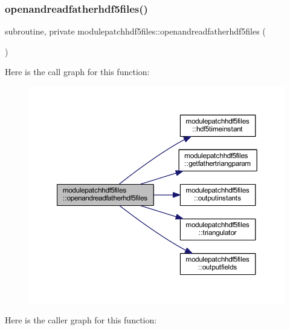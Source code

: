 \subsubsection{\texorpdfstring{openandreadfatherhdf5files()}{openandreadfatherhdf5files()}}
{\footnotesize\ttfamily subroutine, private modulepatchhdf5files\+::openandreadfatherhdf5files (\begin{DoxyParamCaption}{ }\end{DoxyParamCaption})\hspace{0.3cm}{\ttfamily [private]}}

Here is the call graph for this function\+:\nopagebreak
\begin{figure}[H]
\begin{center}
\leavevmode
\includegraphics[width=350pt]{namespacemodulepatchhdf5files_aa13f313e5bea3ff364240319fb791f70_cgraph}
\end{center}
\end{figure}
Here is the caller graph for this function\+:\nopagebreak
